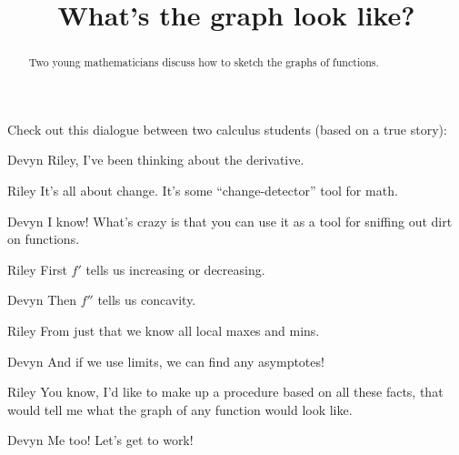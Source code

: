 \documentclass{ximera}
\title[Break-Ground:]{What's the graph look like?}
\begin{document}
\begin{abstract}
Two young mathematicians discuss how to sketch the graphs of functions.
\end{abstract}
\maketitle

Check out this dialogue between two calculus students (based on a true
story):

\begin{dialogue}
\item[Devyn] Riley, I've been thinking about the derivative. 
\item[Riley] It's all about change. It's some ``change-detector'' tool
  for math.
\item[Devyn] I know!  What's crazy is that you can use it as a tool
  for sniffing out dirt on functions.
\item[Riley] First $f'$ tells us increasing or decreasing.
\item[Devyn] Then $f''$ tells us concavity.
\item[Riley] From just that we know all local maxes and mins.
\item[Devyn] And if we use limits, we can find any asymptotes!
\item[Riley] You know, I'd like to make up a procedure based on all
  these facts, that would tell me what the graph of any function would look like.
\item[Devyn] Me too! Let's get to work!
\end{dialogue}
\end{document}
